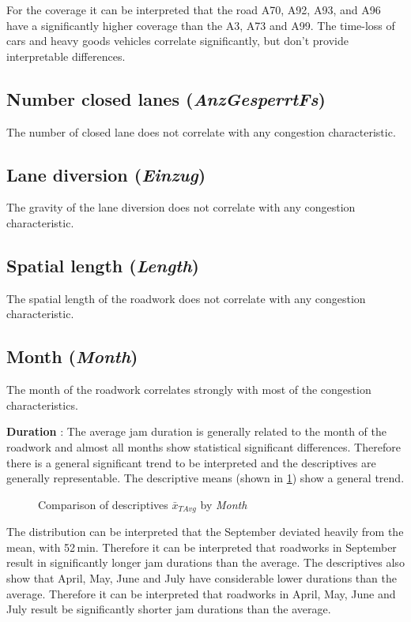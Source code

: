 For the coverage it can be interpreted that the road A70, A92, A93, and A96 have a significantly higher coverage than the A3, A73 and A99. The time-loss of cars and heavy goods vehicles correlate significantly, but don't provide interpretable differences.

\subsection{Number closed lanes (\textit{AnzGesperrtFs})}
The number of closed lane does not correlate with any congestion characteristic.

\subsection{Lane diversion (\textit{Einzug})}
The gravity of the lane diversion does not correlate with any congestion characteristic.

\subsection{Spatial length (\textit{Length})}
The spatial length of the roadwork does not correlate with any congestion characteristic. 

\subsection{Month (\textit{Month})}
The month of the roadwork correlates strongly with most of the congestion characteristics. 

\textbf{Duration} : The average jam duration is generally related to the month of the roadwork and almost all months show statistical significant differences. Therefore there is a general significant trend to be interpreted and the descriptives are generally representable. The descriptive means (shown in \cref{fig:arbis_summary_month_duration}) show a general trend.
\begin{figure}[ht!]
	\data
	\pgfplotstablesort[sort key=gMeanSAvg, sort cmp=float >]{\datasorted}{\data}
	\tiny
	\centering
	\caption{Comparison of descriptives $\bar{x}_{TAvg}$ by \textit{Month}}
	\label{fig:arbis_summary_month_duration}
\end{figure}
The distribution can be interpreted that the September deviated heavily from the mean, with 52\,min. Therefore it can be interpreted that roadworks in September result in significantly longer jam durations than the average. The descriptives also show that April, May, June and July have considerable lower durations than the average. Therefore it can be interpreted that roadworks in April, May, June and July result be significantly shorter jam durations than the average. 

